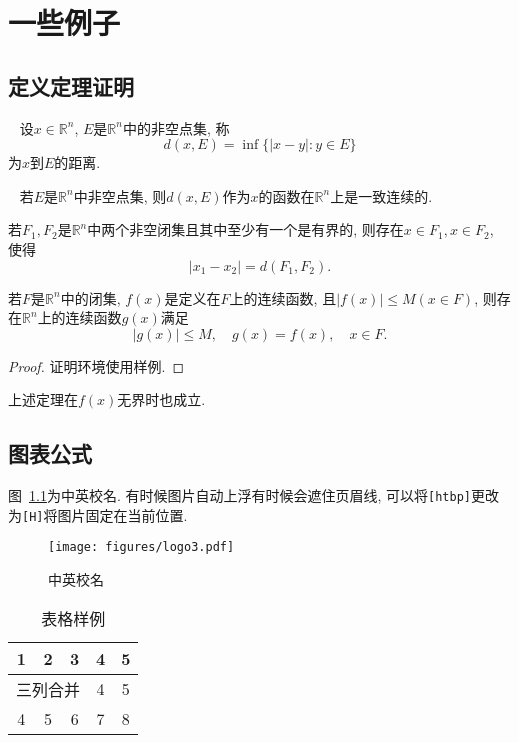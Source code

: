 \chapter{一些例子}
\section{定义定理证明}
\begin{defin}~\cite[定义1.33]{Zhou:2016}
设$x\in\mathbb{R}^n$, $E$是$\mathbb{R}^n$中的非空点集, 称
\[d(x,E)=\inf\{|x-y|: y\in E\}\]
为$x$到$E$的距离.
\end{defin}

\begin{lemma}~\cite[定理1.25]{Zhou:2016}
若$E$是$\mathbb{R}^n$中非空点集, 则$d(x,E)$作为$x$的函数在$\mathbb{R}^n$上是一致连续的.
\end{lemma}

\begin{coro}
若$F_1,F_2$是$\mathbb{R}^n$中两个非空闭集且其中至少有一个是有界的, 则存在$x\in F_1,x\in F_2$, 使得
\[|x_1-x_2|=d(F_1,F_2).\]
\end{coro}

\begin{theorem}
若$F$是$\mathbb{R}^n$中的闭集, $f(x)$是定义在$F$上的连续函数, 且$|f(x)|\leq M(x\in F)$, 则存在$\mathbb{R}^n$上的连续函数$g(x)$满足
\[|g(x)|\leq M,\quad g(x)=f(x),\quad x\in F.\]
\end{theorem}

\begin{proof}
证明环境使用样例.
\end{proof}

\begin{remark}
上述定理在$f(x)$无界时也成立.
\end{remark}

\section{图表公式}
图~\ref{fig:logo}为中英校名. 有时候图片自动上浮有时候会遮住页眉线, 可以将{\tt [htbp]}更改为{\tt [H]}将图片固定在当前位置.
\begin{figure}[htbp]
\centering\texttt{[image: figures/logo3.pdf]}
\caption{中英校名}\label{fig:logo}
\end{figure}

\begin{table}[htbp]
\centering\caption{表格样例}\label{tab:tab}\begin{tabular}{ccccc}
\hline
1 & 2 & 3 & 4 & 5\\
\hline
\multicolumn{3}{c}{三列合并} & 4 & 5\\
\hline
4 & 5 & 6 & 7 & 8\\
\hline
\end{tabular}\end{table}

